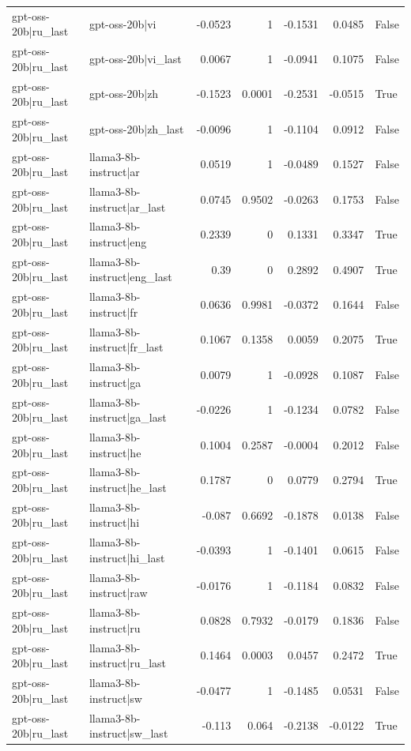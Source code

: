 \begin{table}
\begin{tabular}{l l r r r r l}
gpt-oss-20b|ru_last & gpt-oss-20b|vi & -0.0523 & 1 & -0.1531 & 0.0485 & False \\
gpt-oss-20b|ru_last & gpt-oss-20b|vi_last & 0.0067 & 1 & -0.0941 & 0.1075 & False \\
gpt-oss-20b|ru_last & gpt-oss-20b|zh & -0.1523 & 0.0001 & -0.2531 & -0.0515 & True \\
gpt-oss-20b|ru_last & gpt-oss-20b|zh_last & -0.0096 & 1 & -0.1104 & 0.0912 & False \\
gpt-oss-20b|ru_last & llama3-8b-instruct|ar & 0.0519 & 1 & -0.0489 & 0.1527 & False \\
gpt-oss-20b|ru_last & llama3-8b-instruct|ar_last & 0.0745 & 0.9502 & -0.0263 & 0.1753 & False \\
gpt-oss-20b|ru_last & llama3-8b-instruct|eng & 0.2339 & 0 & 0.1331 & 0.3347 & True \\
gpt-oss-20b|ru_last & llama3-8b-instruct|eng_last & 0.39 & 0 & 0.2892 & 0.4907 & True \\
gpt-oss-20b|ru_last & llama3-8b-instruct|fr & 0.0636 & 0.9981 & -0.0372 & 0.1644 & False \\
gpt-oss-20b|ru_last & llama3-8b-instruct|fr_last & 0.1067 & 0.1358 & 0.0059 & 0.2075 & True \\
gpt-oss-20b|ru_last & llama3-8b-instruct|ga & 0.0079 & 1 & -0.0928 & 0.1087 & False \\
gpt-oss-20b|ru_last & llama3-8b-instruct|ga_last & -0.0226 & 1 & -0.1234 & 0.0782 & False \\
gpt-oss-20b|ru_last & llama3-8b-instruct|he & 0.1004 & 0.2587 & -0.0004 & 0.2012 & False \\
gpt-oss-20b|ru_last & llama3-8b-instruct|he_last & 0.1787 & 0 & 0.0779 & 0.2794 & True \\
gpt-oss-20b|ru_last & llama3-8b-instruct|hi & -0.087 & 0.6692 & -0.1878 & 0.0138 & False \\
gpt-oss-20b|ru_last & llama3-8b-instruct|hi_last & -0.0393 & 1 & -0.1401 & 0.0615 & False \\
gpt-oss-20b|ru_last & llama3-8b-instruct|raw & -0.0176 & 1 & -0.1184 & 0.0832 & False \\
gpt-oss-20b|ru_last & llama3-8b-instruct|ru & 0.0828 & 0.7932 & -0.0179 & 0.1836 & False \\
gpt-oss-20b|ru_last & llama3-8b-instruct|ru_last & 0.1464 & 0.0003 & 0.0457 & 0.2472 & True \\
gpt-oss-20b|ru_last & llama3-8b-instruct|sw & -0.0477 & 1 & -0.1485 & 0.0531 & False \\
gpt-oss-20b|ru_last & llama3-8b-instruct|sw_last & -0.113 & 0.064 & -0.2138 & -0.0122 & True \\

\end{tabular}
\end{table}
